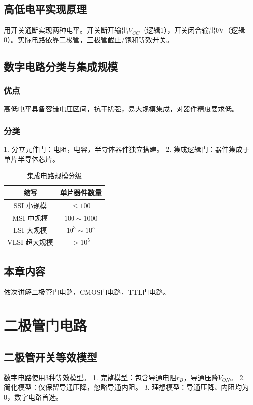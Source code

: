 \subsection{高低电平实现原理}
用开关通断实现两种电平。开关断开输出\(V_{CC}\)（逻辑1），开关闭合输出0V（逻辑0）。实际电路依靠二极管，三极管截止/饱和等效开关。

\subsection{数字电路分类与集成规模}
\subsubsection{优点}
高低电平具备容错电压区间，抗干扰强，易大规模集成，对器件精度要求低。

\subsubsection{分类}
1. 分立元件门：电阻，电容，半导体器件独立搭建。
2. 集成逻辑门：器件集成于单片半导体芯片。

\begin{table}[htbp]
    \centering
    \caption{集成电路规模分级}
    \begin{tabular}{|c|c|}
        \hline
        缩写 & 单片器件数量 \\
        \hline
        SSI 小规模 & $\leq 100$ \\
        \hline
        MSI 中规模 & $100 \sim 1000$ \\
        \hline
        LSI 大规模 & $10^3 \sim 10^5$ \\
        \hline
        VLSI 超大规模 & $> 10^5$ \\
        \hline
    \end{tabular}
\end{table}

\subsection{本章内容}
依次讲解二极管门电路，CMOS门电路，TTL门电路。

\section{二极管门电路}
\subsection{二极管开关等效模型}
数字电路使用3种等效模型。
1. 完整模型：包含导通电阻\(r_D\)，导通压降\(V_{ON}\)。
2. 简化模型：仅保留导通压降，忽略导通内阻。
3. 理想模型：导通压降、内阻均为0，数字电路首选。

